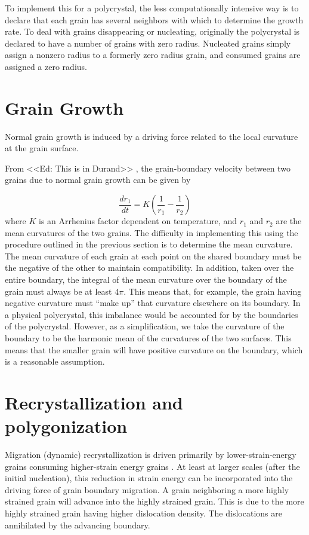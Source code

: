 \documentclass{igs}
\begin{document}
To implement this for a polycrystal, the less computationally intensive way is to declare that each grain has several neighbors with which to determine the growth rate. To deal with grains disappearing or nucleating, originally the polycrystal is declared to have a number of grains with zero radius. Nucleated grains simply assign a nonzero radius to a formerly zero radius grain, and consumed grains are assigned a zero radius. 
\section{Grain Growth}
Normal grain growth is induced by a driving force related to the local curvature at the grain surface.

From \citet{durand2006} <<Ed: This is in Durand>> , the grain-boundary velocity between two grains due to normal grain growth can be given by

\begin{equation}
\frac{dr_1}{dt} = K \left( \frac{1}{r_1}-\frac{1}{r_2} \right)
\end{equation}
where $K$ is an Arrhenius factor dependent on temperature, and $r_1$ and $r_2$ are the mean curvatures of the two grains. The difficulty in implementing this using the procedure outlined in the previous section is to determine the mean curvature. The mean curvature of each grain at each point on the shared boundary must be the negative of the other to maintain compatibility. In addition, taken over the entire boundary, the integral of the mean curvature over the boundary of the grain must always be at least $4 \pi$. This means that, for example, the grain having negative curvature must ``make up'' that curvature elsewhere on its boundary. In a physical polycrystal, this imbalance would be accounted for by the boundaries of the polycrystal. However, as a simplification, we take the curvature of the boundary to be the harmonic mean of the curvatures of the two surfaces. This means that the smaller grain will have positive curvature on the boundary, which is a reasonable assumption. 

\section{Recrystallization and polygonization}
Migration (dynamic) recrystallization is driven primarily by lower-strain-energy grains consuming higher-strain energy grains \citep{duval1995}. At least at larger scales (after the initial nucleation), this reduction in strain energy can be incorporated into the driving force of grain boundary migration. A grain neighboring a more highly strained grain will advance into the highly strained grain. This is due to the more highly strained grain having higher dislocation density. The dislocations are annihilated by the advancing boundary. 
\end{document}
